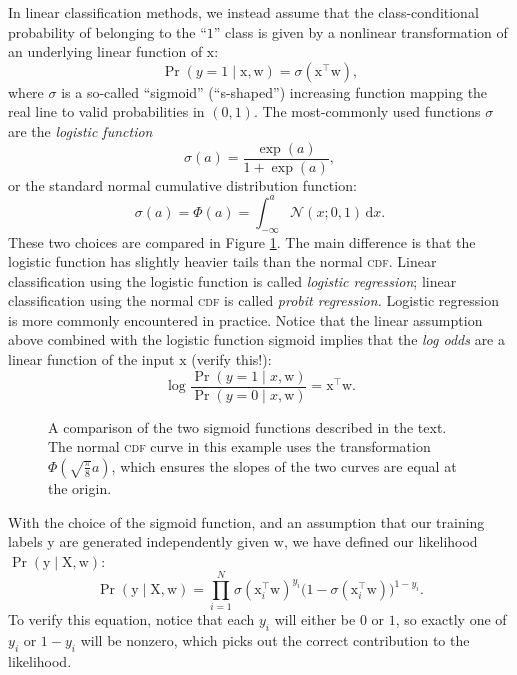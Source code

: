 \documentclass{article}
\newcommand{\acro}[1]{\textsc{\MakeLowercase{#1}}}
\newcommand{\given}{\mid}
\newcommand{\mc}[1]{\mathcal{#1}}
\newcommand{\intd}[1]{\,\mathrm{d}{#1}}
\newcommand{\trans}{^\top}
\newcommand{\mat}[1]{\bm{\mathrm{#1}}}
\renewcommand{\vec}[1]{\bm{\mathrm{#1}}}
\begin{document}
In linear classification methods, we instead assume that the
class-conditional probability of belonging to the ``$1$'' class is
given by a nonlinear transformation of an underlying linear function
of $\vec{x}$:
\begin{equation*}
  \Pr(y = 1 \given \vec{x}, \vec{w})
  =
  \sigma(\vec{x}\trans \vec{w}),
\end{equation*}
where $\sigma$ is a so-called ``sigmoid'' (``s-shaped'') increasing
function mapping the real line to valid probabilities in $(0, 1)$.
The most-commonly used functions $\sigma$ are the \emph{logistic function}
\begin{equation*}
  \sigma(a) = \frac{\exp(a)}{1 + \exp(a)},
\end{equation*}
or the standard normal cumulative distribution function:
\begin{equation*}
  \sigma(a) = \Phi(a) = \int_{-\infty}^a \mc{N}(x; 0, 1) \intd x.
\end{equation*}
These two choices are compared in Figure \ref{sigmoids}.  The main
difference is that the logistic function has slightly heavier tails
than the normal \acro{CDF}.  Linear classification using the logistic
function is called \emph{logistic regression}; linear classification
using the normal \acro{CDF} is called \emph{probit regression.}
Logistic regression is more commonly encountered in practice.  Notice
that the linear assumption above combined with the logistic function
sigmoid implies that the \emph{log odds} are a linear function of the
input $\vec{x}$ (verify this!):
\begin{equation*}
  \log
  \frac{\Pr(y = 1 \given x, \vec{w})}
       {\Pr(y = 0 \given x, \vec{w})}
  =
  \vec{x}\trans \vec{w}.
\end{equation*}

\begin{figure}
  \centering
  
  \caption{A comparison of the two sigmoid functions described in the
    text.  The normal \acro{CDF} curve in this example uses the
    transformation $\Phi(\sqrt{\frac{\pi}{8}} a)$, which ensures the
    slopes of the two curves are equal at the origin.}
  \label{sigmoids}
\end{figure}

With the choice of the sigmoid function, and an assumption that our
training labels $\vec{y}$ are generated independently given $\vec{w}$,
we have defined our likelihood $\Pr(\vec{y} \given \mat{X}, \vec{w})$:
\begin{equation}
  \label{likelihood}
  \Pr(\vec{y} \given \mat{X}, \vec{w})
  =
  \prod_{i = 1}^N
  \sigma(\vec{x}_i\trans \vec{w})^{y_i}
  \bigl(1 - \sigma(\vec{x}_i\trans \vec{w})\bigr)^{1 - y_i}.
\end{equation}
To verify this equation, notice that each $y_i$ will either be $0$ or
$1$, so exactly one of $y_i$ or $1 - y_i$ will be nonzero, which
picks out the correct contribution to the likelihood.
\end{document}
